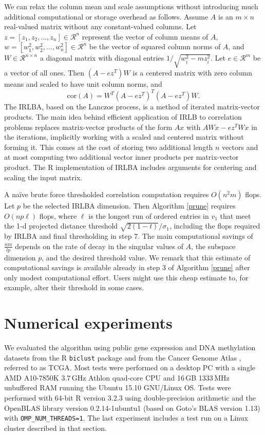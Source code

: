 \documentclass{article}
\let\proglang=\textsf
\numberwithin{algorithmctr}{section}
\begin{document}
We can relax the column mean and scale assumptions without introducing much
additional computational or storage overhead as follows. Assume $A$ is an
$m\times n$ real-valued matrix without any constant-valued columns. Let
$z=[z_1,z_2,\ldots,z_n]\in\mathcal{R}^n$ represent the vector of column means
of $A$, $w=[w_1^2,w_2^2,\ldots,w_n^2]\in\mathcal{R}^n$
be the vector of squared column norms of $A$, and $W\in\mathcal{R}^{n\times n}$
a diagonal matrix with diagonal entries $1/\sqrt{w_i^2 - m z_i^2}$.  Let
$e\in\mathcal{R}^m$ be a vector of all ones.  Then $(A - ez^T)W$ is a centered
matrix with zero column means and scaled to have unit column norms, and
\[
\mathrm{cor}(A) = W^T (A-ez^T)^T (A-ez^T) W.
\]
The IRLBA, based on the Lanczos process, is a method of iterated matrix-vector
products. The main idea behind efficient application of IRLB to correlation
problems replaces matrix-vector products of the form $Ax$ with $AWx - ez^TWx$ in
the iterations, implicitly working with a scaled and centered matrix without
forming it.  This comes at the cost of storing two additional length $n$ vectors and
at most computing two additional vector inner products per matrix-vector product.
The \proglang{R} implementation \cite{irlbar} of IRLBA includes arguments for centering and
scaling the input matrix.

A na\"ive brute force thresholded correlation computation requires $O(n^2 m)$ flops.
Let $p$ be the selected IRLBA dimension. Then Algorithm \ref{prune} requires
$O(n p \ell)$ flops, where $\ell$ is the longest run of ordered entries in
$v_1$ that meet the 1-d projected distance threshold $\sqrt{2(1-t)}/\sigma_1$,
including the flops required by IRLBA and final thresholding in step 7.  The
main computational savings of $\frac{nm}{lp}$ depends on the rate of decay in
the singular values of $A$, the subspace dimension $p$, and the desired
threshold value. We remark that this estimate of computational savings is
available already in step 3 of Algorithm \ref{prune} after only modest
computational effort. Users might use this cheap estimate to, for example,
alter their threshold in some cases.


\section{Numerical experiments}\label{examples}

We evaluated the algorithm using public gene expression and DNA methylation
datasets from the \proglang{R} {\tt biclust} \cite{biclust} package and from
the Cancer Genome Atlas \cite{gdac}, referred to as TCGA.  Most tests were
performed on a desktop PC with a single AMD A10-7850K 3.7$\,$GHz Athlon
quad-core CPU and 16$\,$GB 1333$\,$MHz unbuffered RAM running the Ubuntu 15.10
GNU/Linux OS. Tests were performed with 64-bit \proglang{R} version 3.2.3 using
double-precision arithmetic and the OpenBLAS library version 0.2.14-1ubuntu1
(based on Goto's BLAS version 1.13) with {\tt OMP\_NUM\_THREADS=1}. The last
experiment includes a test run on a Linux cluster described in that section.
\end{document}
